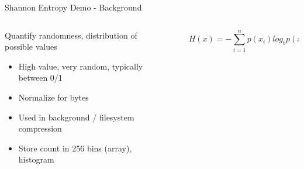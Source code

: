 \documentclass[aspectratio=169]{beamer}
\begin{document}
\begin{frame}{Shannon Entropy Demo - Background}
        \begin{columns}
            \begin{column}{0.50\textwidth}
                \footnotesize
                Quantify randomness, distribution of possible values
                \begin{itemize}
                    \item High value, very random, typically between 0/1
                    \item Normalize for bytes
                    \item Used in background / filesystem compression
                    \item Store count in 256 bins (array), histogram
                \end{itemize}
            \end{column}
            \begin{column}{0.50\textwidth}
                \begingroup
                \begin{figure}
                    \centering
                    $$H(x)=-\sum_{i=1}^{n}p(x_i)log_bp(x_i)$$
                \end{figure}
                \endgroup
            \end{column}
        \end{columns}
\end{frame}
\end{document}
